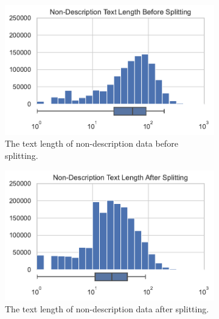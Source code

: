 \documentclass[a4paper, 12pt, oneside]{book} %
\begin{document}
\begin{figure} [h!]
     \centering
     \begin{subfigure}[b]{0.49\textwidth}
         \centering
         \includegraphics[width=\textwidth]{figures/histogram_text_length_1.pdf}
         \caption{The text length of non-description data before splitting.}
         \label{fig:text_length_1}
     \end{subfigure}
     \hfill
     \begin{subfigure}[b]{0.49\textwidth}
         \centering
         \includegraphics[width=\textwidth]{histogram_text_length_3.pdf}
         \caption{The text length of non-description data after splitting.}
         \label{fig:text_length_3}
     \end{subfigure}
     \vfill
     \begin{subfigure}[b]{0.49\textwidth}
         \centering

\end{subfigure}
\end{figure}
\end{document}
